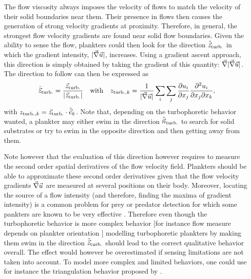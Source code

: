 The flow viscosity always imposes the velocity of flows to match the velocity of their solid boundaries near them.
Their presence in flows then causes the generation of strong velocity gradients at proximity.
Therefore, in general, the strongest flow velocity gradients are found near solid flow boundaries.
Given the ability to sense the flow, plankters could then look for the direction $\hat{\vec{z}}_{\mathrm{turb.}}$ in which the gradient intensity, $\lvert\vec{\nabla} \vec{u}\rvert$, increases.
Using a gradient ascent approach, this direction is simply obtained by taking the gradient of this quantity: $\vec{\nabla} \lvert\vec{\nabla} \vec{u}\rvert$.
The direction to follow can then be expressed as
\begin{equation}\label{eq:turbophoresis_direction}
	\hat{\vec{z}}_{\mathrm{turb.}} = \frac{\vec{z}_{\mathrm{turb.}}}{\lvert\vec{z}_{\mathrm{turb.}}\rvert} \quad \text{with} \quad z_{\mathrm{turb.},k} = \frac{1}{\lvert\vec{\nabla} \vec{u}\rvert} \sum_i \sum_j \frac{\partial u_i}{\partial x_j} \frac{\partial^2 u_i}{\partial x_j \partial x_k},
\end{equation}
with $z_{\mathrm{turb.},k} = \vec{z}_{\mathrm{turb.}} \cdot \hat{\vec{e}}_k$.
Note that, depending on the turbophoretic behavior wanted, a plankter may either swim in the direction $\hat{\vec{n}}_{\mathrm{turb.}}$ to search for solid substrates or try to swim in the opposite direction and then getting away from them.

Note however that the evaluation of this direction however requires to measure the second order spatial derivatives of the flow velocity field.
Plankters should be able to approximate these second order derivatives given that the flow velocity gradients $\vec{\nabla} \vec{u}$ are measured at several positions on their body.
Moreover, locating the source of a flow intensity (and therefore, finding the maxima of gradient intensity) is a common problem for prey or predator detection for which some pankters are known to be very effective \citep{kiorboe1999predator, kiorboe1999hydrodynamic, jiang2002hydrodynamic}.
Therefore even though the turbophoretic behavior is more complex behavior [for instance flow measure depends on plankter orientation \citep{fields2010orientation}] modelling turbophoretic plankters by making them swim in the direction $\hat{\vec{z}}_{\mathrm{turb.}}$ should lead to the correct qualitative behavior overall.
The effect would however be overestimated if sensing limitations are not taken into account.
To model more complex and limited behaviors, one could use for instance the triangulation behavior proposed by \citet{redaelli2021efficient}.

